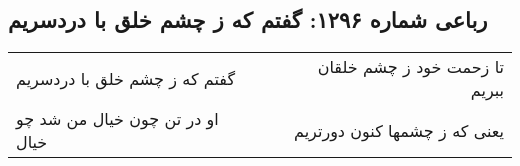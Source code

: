 \begin{center}
\section*{رباعی شماره ۱۲۹۶: گفتم که ز چشم خلق با دردسریم}
\label{sec:1296}
\begin{longtable}{l p{0.5cm} r}
گفتم که ز چشم خلق با دردسریم
&&
تا زحمت خود ز چشم خلقان ببریم
\\
او در تن چون خیال من شد چو خیال
&&
یعنی که ز چشمها کنون دورتریم
\\
\end{longtable}
\end{center}
